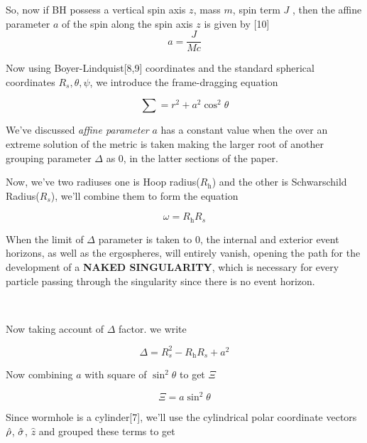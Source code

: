 \documentclass{article}
\begin{document}
So, now if BH  possess a vertical spin axis $z$, mass $m$, spin term $J$ , then the affine parameter $a$ of the spin along the spin axis $z$ is given by [10]
\begin{equation}
    a= \frac{J}{Mc}
    \label{3}
\end{equation}




Now using Boyer-Lindquist[8,9] coordinates and the standard spherical coordinates $R_s, \theta, \psi$, we introduce the frame-dragging equation 

\begin{equation}
    \sum= r^2+ a^2\cos^2\theta
    \label{4}
\end{equation}

We've discussed \textit{affine parameter} $a$ has a constant value when the over an extreme solution of the metric is taken making the larger root of another grouping parameter $\Delta$ as 0, in the latter sections of the paper.


Now, we've two radiuses one is Hoop radius($R_\text{h}$) and the other is Schwarschild Radius($R_s$), we'll combine them to form the equation

\begin{equation}
    \omega=R_\text{h} R_s
    \label{5}
\end{equation}


  When the limit of $\Delta$ parameter is taken to 0,  the internal and exterior event horizons, as well as the ergospheres, will entirely vanish, opening the path for the development of a \textbf{NAKED SINGULARITY}, which is necessary for every particle passing through the singularity since there is no event horizon. 


\

Now taking account of $\Delta$ factor. we write

\begin{equation}
    \Delta=R_s^2 - R_\text{h} R_s+ a^2
    \label{6}
\end{equation}

Now combining $a$ with square of $\sin^2 \theta$ to get $\Xi$

\begin{equation}
  \Xi= a \sin^2\theta
  \label{7}
\end{equation}


Since wormhole is a cylinder[7], we'll use the cylindrical polar coordinate 
vectors $ \Hat{\rho}$, $\Hat{\sigma}$,  $\hat{z}$ and grouped these terms to get
\end{document}
